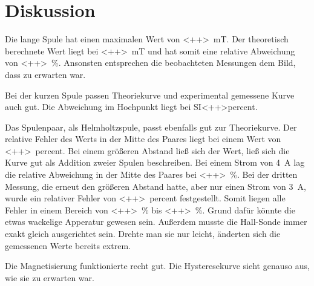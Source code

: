 \section{Diskussion}
\label{sec:Diskussion}

Die lange Spule hat einen maximalen Wert von \SI{<++>}{\milli\tesla}. Der theoretisch berechnete Wert liegt bei \SI{<++>}{\milli\tesla} und hat somit eine relative Abweichung von \SI{<++>}{\percent}. Ansonsten entsprechen die beobachteten Messungen dem Bild, dass zu erwarten war. 

Bei der kurzen Spule passen Theoriekurve und experimental gemessene Kurve auch gut. Die Abweichung im Hochpunkt liegt bei SI{<++>}{percent}. 

Das Spulenpaar, als Helmholtzspule, passt ebenfalls gut zur Theoriekurve. Der relative Fehler des Werts in der Mitte des Paares liegt bei einem Wert von \SI{<++>}{percent}.
Bei einem größeren Abstand ließ sich der Wert, ließ sich die Kurve gut als Addition zweier Spulen beschreiben. Bei einem Strom von \SI{4}{\ampere} lag die relative Abweichung in der Mitte des Paares bei \SI{<++>}{\percent}. 
Bei der dritten Messung, die erneut den größeren Abstand hatte, aber nur einen Strom von \SI{3}{\ampere}, wurde ein relativer Fehler von \SI{<++>}{percent} festgestellt. Somit liegen alle Fehler in einem Bereich von \SI{<++>}{\percent} bis \SI{<++>}{\percent}. Grund dafür könnte die etwas wackelige Apperatur gewesen sein. Außerdem musste die Hall-Sonde immer exakt gleich ausgerichtet sein. Drehte man sie nur leicht, änderten sich die gemessenen Werte bereits extrem. 

Die Magnetisierung funktionierte recht gut. Die Hysteresekurve sieht genauso aus, wie sie zu erwarten war. 
